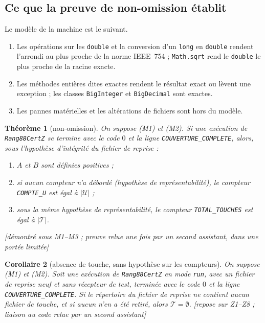 \documentclass[11pt,a4paper]{amsart}
\theoremstyle{plain}
\newtheorem{theoreme}{Théorème}[section]
\newtheorem{corollaire}[theoreme]{Corollaire}
\theoremstyle{definition}
\numberwithin{equation}{section}
\newcommand{\Uc}{\mathcal{U}}
\newcommand{\Tc}{\mathcal{T}}
\newcommand{\st}[1]{\textup{\textsf{\small[#1]}}}
\begin{document}
\subsection{Ce que la preuve de non-omission établit}
Le modèle de la machine est le suivant.
\begin{enumerate}[label=\textup{(M\arabic*)}]
\item Les opérations sur les \texttt{double} et la conversion d'un \texttt{long} en \texttt{double} rendent l'arrondi au plus proche de la norme IEEE~754 ; \texttt{Math.sqrt} rend le \texttt{double} le plus proche de la racine exacte.
\item Les méthodes entières dites exactes rendent le résultat exact ou lèvent une exception ; les classes \texttt{BigInteger} et \texttt{BigDecimal} sont exactes.
\item Les pannes matérielles et les altérations de fichiers sont hors du modèle.
\end{enumerate}

\begin{theoreme}[non-omission]\label{thm:nonomission}
On suppose \textup{(M1)} et \textup{(M2)}. Si une exécution de \texttt{Rang88CertZ} se termine avec le code $0$ et la ligne \texttt{COUVERTURE\_COMPLETE}, alors, sous l'hypothèse d'intégrité du fichier de reprise :
\begin{enumerate}[label=\textup{(\arabic*)}]
\item $A$ et $B$ sont définies positives ;
\item si aucun compteur n'a débordé (hypothèse de représentabilité), le compteur \texttt{COMPTE\_U} est égal à $|\Uc|$ ;
\item sous la même hypothèse de représentabilité, le compteur \texttt{TOTAL\_TOUCHES} est égal à $|\Tc|$.
\end{enumerate}
\st{démontré sous M1--M3 ; preuve relue une fois par un second assistant, dans une portée limitée}
\end{theoreme}

\begin{corollaire}[absence de touche, sans hypothèse sur les compteurs]\label{cor:touche}
On suppose \textup{(M1)} et \textup{(M2)}. Soit une exécution de \texttt{Rang88CertZ} en mode \texttt{run}, avec un fichier de reprise neuf et sans récepteur de test, terminée avec le code $0$ et la ligne \texttt{COUVERTURE\_COMPLETE}. Si le répertoire du fichier de reprise ne contient aucun fichier de touche, et si aucun n'en a été retiré, alors $\Tc=\emptyset$.
\st{repose sur Z1--Z8 ; liaison au code relue par un second assistant}
\end{corollaire}
\end{document}

